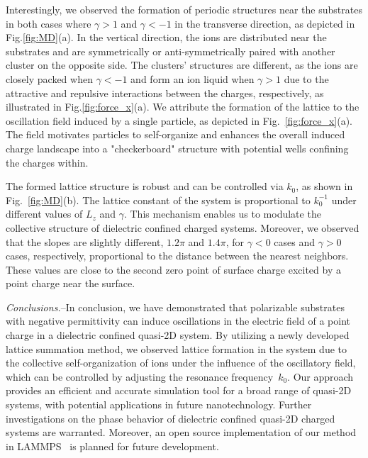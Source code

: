 \documentclass[aps,prl,reprint,showpacs,floatfix,superscriptaddress]{revtex4-2}
\begin{document}
Interestingly, we observed the formation of periodic structures near the substrates in both cases where $\gamma > 1$ and $\gamma < -1$ in the transverse direction, as depicted in Fig.\ref{fig:MD}(a). 
In the vertical direction, the ions are distributed near the substrates and are symmetrically or anti-symmetrically paired with another cluster on the opposite side. 
The clusters' structures are different, as the ions are closely packed when $\gamma < -1$ and form an ion liquid when $\gamma > 1$ due to the attractive and repulsive interactions between the charges, respectively, as illustrated in Fig.\ref{fig:force_x}(a).
We attribute the formation of the lattice to the oscillation field induced by a single particle, as depicted in Fig.~\ref{fig:force_x}(a). The field motivates particles to self-organize and enhances the overall induced charge landscape into a "checkerboard" structure with potential wells confining the charges within.

The formed lattice structure is robust and can be controlled via $k_0$, as shown in Fig.~\ref{fig:MD}(b). 
The lattice constant of the system is proportional to $k_0^{-1}$ under different values of $L_z$ and $\gamma$. This mechanism enables us to modulate the collective structure of dielectric confined charged systems.
Moreover, we observed that the slopes are slightly different, $1.2\pi$ and $1.4\pi$, for $\gamma < 0$ cases and $\gamma > 0$ cases, respectively, proportional to the distance between the nearest neighbors. 
These values are close to the second zero point of surface charge excited by a point charge near the surface.

\textit{Conclusions.}--In conclusion, we have demonstrated that polarizable substrates with negative permittivity can induce oscillations in the electric field of a point charge in a dielectric confined quasi-2D system. By utilizing a newly developed lattice summation method, we observed lattice formation in the system due to the collective self-organization of ions under the influence of the oscillatory field, which can be controlled by adjusting the resonance frequency~$k_0$. Our approach provides an efficient and accurate simulation tool for a broad range of quasi-2D systems, with potential applications in future nanotechnology. Further investigations on the phase behavior of dielectric confined quasi-2D charged systems are warranted. Moreover, an open source implementation of our method in LAMMPS~\cite{LAMMPS} is planned for future development.
\end{document}
